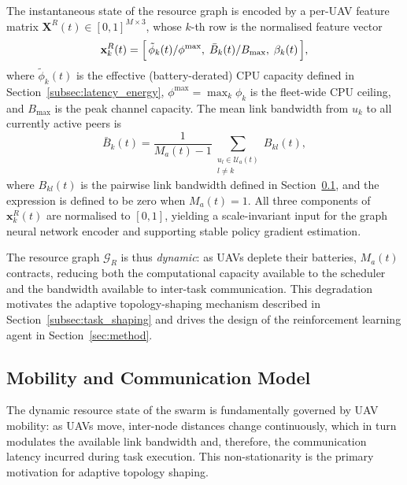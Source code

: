 The instantaneous state of the resource graph is encoded by a
per-UAV feature matrix
$\mathbf{X}^R(t) \in [0, 1]^{M \times 3}$,
whose $k$-th row is the normalised feature vector
\begin{equation}
  \mathbf{x}_k^R(t) =
  \Bigl[\,
    \tilde{\phi}_k(t)/\phi^{\max},\;
    \bar{B}_k(t)/B_{\max},\;
    \beta_k(t)\,
  \Bigr],
  \label{eq:res_features}
\end{equation}
where $\tilde{\phi}_k(t)$ is the effective (battery-derated) CPU
capacity defined in Section~\ref{subsec:latency_energy},
$\phi^{\max} = \max_{k} \phi_k$ is the fleet-wide CPU ceiling, and
$B_{\max}$ is the peak channel capacity.
The mean link bandwidth from $u_k$ to all currently active peers is
\begin{equation}
  \bar{B}_k(t) =
  \frac{1}{M_a(t) - 1}
  \sum_{\substack{u_l \in \mathcal{U}_a(t) \\ l \neq k}} B_{kl}(t),
  \label{eq:mean_bw}
\end{equation}
where $B_{kl}(t)$ is the pairwise link bandwidth defined in
Section~\ref{subsec:mobility}, and the expression is defined to be
zero when $M_a(t) = 1$.
All three components of $\mathbf{x}_k^R(t)$ are normalised to
$[0, 1]$, yielding a scale-invariant input for the graph neural
network encoder and supporting stable policy gradient estimation.

The resource graph $\mathcal{G}_R$ is thus \emph{dynamic}: as UAVs
deplete their batteries, $M_a(t)$ contracts, reducing both the
computational capacity available to the scheduler and the bandwidth
available to inter-task communication.
This degradation motivates the adaptive topology-shaping mechanism
described in Section~\ref{subsec:task_shaping} and drives the
design of the reinforcement learning agent in
Section~\ref{sec:method}.

\subsection{Mobility and Communication Model}
\label{subsec:mobility}

The dynamic resource state of the swarm is fundamentally governed by
UAV mobility: as UAVs move, inter-node distances change continuously,
which in turn modulates the available link bandwidth and, therefore,
the communication latency incurred during task execution.
This non-stationarity is the primary motivation for adaptive topology
shaping.

